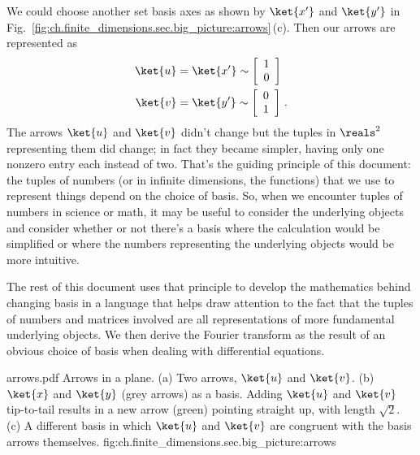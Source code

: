 We could choose another set basis axes as shown by $\ket{x'}$ and $\ket{y'}$ in Fig.~\ref{fig:ch.finite_dimensions.sec.big_picture:arrows}\,(c).
Then our arrows are represented as
\begin{align}
  \ket{u}
    &= \ket{x'} \sim \left[\begin{array}{c} 1 \\ 0 \end{array} \right] \\
  \ket{v}
    &= \ket{y'} \sim \left[\begin{array}{c} 0 \\ 1 \end{array} \right]
  \, .
\end{align}
The arrows $\ket{u}$ and $\ket{v}$ didn't change but the tuples in $\reals^2$ representing them did change; in fact they became simpler, having only one nonzero entry each instead of two.
That's the guiding principle of this document: the tuples of numbers (or in infinite dimensions, the functions) that we use to represent things depend on the choice of basis.
So, when we encounter tuples of numbers in science or math, it may be useful to consider the underlying objects and consider whether or not there's a basis where the calculation would be simplified or where the numbers representing the underlying objects would be more intuitive.

The rest of this document uses that principle to develop the mathematics behind changing basis in a language that helps draw attention to the fact that the tuples of numbers and matrices involved are all representations of more fundamental underlying objects.
We then derive the Fourier transform as the result of an obvious choice of basis when dealing with differential equations.

\quickfig{\columnwidth}
{arrows.pdf}
{Arrows in a plane. (a) Two arrows, $\ket{u}$ and $\ket{v}$. (b) $\ket{x}$ and $\ket{y}$ (grey arrows) as a basis. Adding $\ket{u}$ and $\ket{v}$ tip-to-tail results in a new arrow (green) pointing straight up, with length $\sqrt{2}$. (c) A different basis in which $\ket{u}$ and $\ket{v}$ are congruent with the basis arrows themselves.}
{fig:ch.finite_dimensions.sec.big_picture:arrows}
